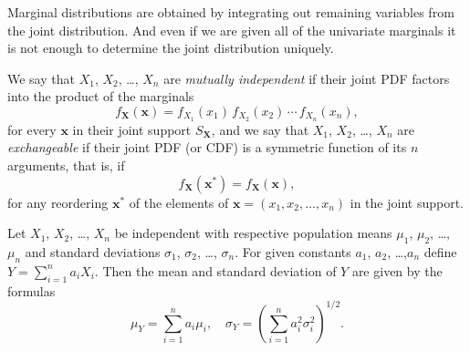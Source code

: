 \documentclass[captions=tableheading]{scrbook}
\begin{document}
Marginal distributions are obtained by integrating out remaining variables from the joint distribution. And even if we are given all of the univariate marginals it is not enough to determine the joint distribution uniquely.

We say that \(X_{1}\), \(X_{2}\), \ldots{}, \(X_{n}\) are \emph{mutually independent} if their joint PDF factors into the product of the marginals
\begin{equation}
f_{\mathbf{X}}(\mathbf{x})=f_{X_{1}}(x_{1})\, f_{X_{2}}(x_{2})\,\cdots\, f_{X_{n}}(x_{n}),
\end{equation}
for every \(\mathbf{x}\) in their joint support \(S_{\mathbf{X}}\), and we say that \(X_{1}\), \(X_{2}\), \ldots{}, \(X_{n}\) are \emph{exchangeable} if their joint PDF (or CDF) is a symmetric function of its \(n\) arguments, that is, if 
\begin{equation}
f_{\mathbf{X}}(\mathbf{x^{\ast}})=f_{\mathbf{X}}(\mathbf{x}),
\end{equation}
for any reordering \(\mathbf{x^{\ast}}\) of the elements of \(\mathbf{x}=(x_{1},x_{2},\ldots,x_{n})\) in the joint support.

\begin{prop}
Let \(X_{1}\), \(X_{2}\), \ldots{}, \(X_{n}\) be independent with respective population means \(\mu_{1}\), \(\mu_{2}\), \ldots{}, \(\mu_{n}\) and standard deviations \(\sigma_{1}\), \(\sigma_{2}\), \ldots{}, \(\sigma_{n}\). For given constants \(a_{1}\), \(a_{2}\), \ldots{},\(a_{n}\) define \(Y=\sum_{i=1}^{n}a_{i}X_{i}\). Then the mean and standard deviation of \(Y\) are given by the formulas
\begin{equation}
\mu_{Y}=\sum_{i=1}^{n}a_{i}\mu_{i},\quad \sigma_{Y}=\left(\sum_{i=1}^{n}a_{i}^{2}\sigma_{i}^{2}\right)^{1/2}.
\end{equation}
\end{prop}
\end{document}
